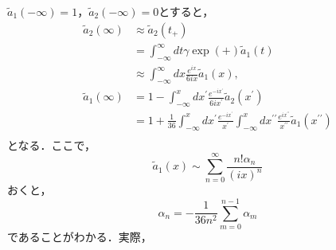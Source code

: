 $\tilde{a}_1(-\infty) =1$，$\tilde{a}_2(-\infty) = 0$とすると，
\begin{align}
  \tilde{a}_2(\infty)
  &\approx \tilde{a}_2(t_+)\\
  &= \int_{-\infty}^{\infty} dt \gamma \exp(+) \tilde{a}_1(t)\\
  &\approx \int_{-\infty}^{\infty} dx \frac{e^{ix}}{6ix} \tilde{a}_1(x),\\
  \tilde{a}_1(\infty)
  &= 1- \int_{-\infty}^x dx^{\prime} \frac{e^{-ix^{\prime}}}{6ix^{\prime}}  \tilde{a}_2(x^{\prime})\\
  &= 1 + \frac{1}{36} \int_{-\infty}^x dx^{\prime} \frac{e^{-ix^{\prime}}}{x^{\prime}} \int_{-\infty}^x dx^{\prime\prime} \frac{e^{ix^{\prime\prime}}}{x^{\prime\prime}} \tilde{a}_1(x^{\prime\prime})\\
\end{align}
となる．ここで，
\begin{equation}
  \tilde{a}_1(x) \sim \sum_{n=0}^{\infty} \frac{n! \alpha_n}{(ix)^n}
\end{equation}
おくと，
\begin{equation}
  \alpha_n = - \frac{1}{36 n^2} \sum_{m=0}^{n-1} \alpha_m 
\end{equation}
であることがわかる．実際，
